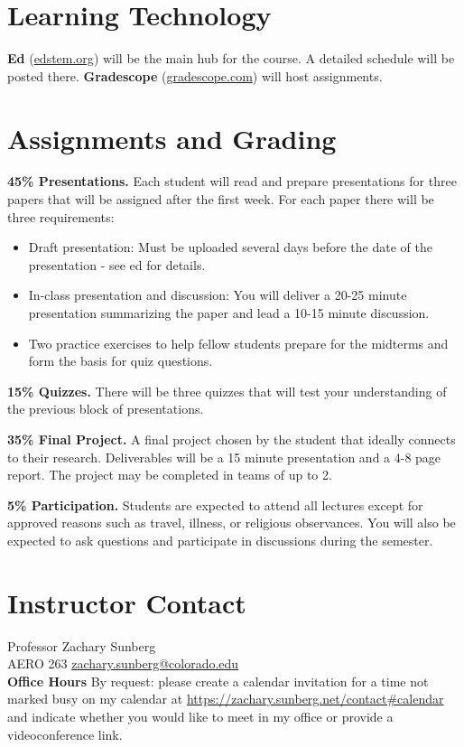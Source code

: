 \documentclass[9pt]{article}
\begin{document}
\section*{Learning Technology}

\textbf{Ed} (\url{edstem.org}) will be the main hub for the course. A detailed schedule will be posted there.
\textbf{Gradescope} (\url{gradescope.com}) will host assignments.

\section*{Assignments and Grading}

\textbf{45\% Presentations.}
Each student will read and prepare presentations for three papers that will be assigned after the first week. For each paper there will be three requirements:
\begin{itemize}[nosep]
    \item Draft presentation: Must be uploaded several days before the date of the presentation - see ed for details.
    \item In-class presentation and discussion: You will deliver a 20-25 minute presentation summarizing the paper and lead a 10-15 minute discussion.
    \item Two practice exercises to help fellow students prepare for the midterms and form the basis for quiz questions.
\end{itemize}

\textbf{15\% Quizzes.}
There will be three quizzes that will test your understanding of the previous block of presentations.

\textbf{35\% Final Project.}
A final project chosen by the student that ideally connects to their research. Deliverables will be a 15 minute presentation and a 4-8 page report. The project may be completed in teams of up to 2.

\textbf{5\% Participation.}
Students are expected to attend all lectures except for approved reasons such as travel, illness, or religious observances. You will also be expected to ask questions and participate in discussions during the semester.

\section*{Instructor Contact}

Professor Zachary Sunberg\\
AERO 263 \href{mailto://zachary.sunberg@colorado.edu}{zachary.sunberg@colorado.edu}\\
\textbf{Office Hours}
By request: please create a calendar invitation for a time not marked busy on my calendar at \url{ https://zachary.sunberg.net/contact#calendar} and indicate whether you would like to meet in my office or provide a videoconference link. \\
\end{document}
